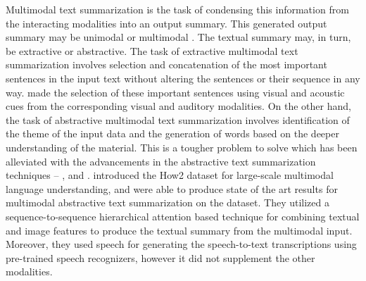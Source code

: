 \documentclass[11pt,a4paper]{article}
\begin{document}
Multimodal text summarization is the task of condensing this information from the interacting modalities into an output summary. This generated output summary may be unimodal or multimodal \cite{zhu2018msmo}. The textual summary may, in turn, be extractive or abstractive. The task of extractive multimodal text summarization involves selection and concatenation of the most important sentences in the input text without altering the sentences or their sequence in any way. \citet{li2017multi} made the selection of these important sentences using visual and acoustic cues from the corresponding visual and auditory modalities. On the other hand, the task of abstractive multimodal text summarization involves identification of the theme of the input data and the generation of words based on the deeper understanding of the material. This is a tougher problem to solve which has been alleviated with the advancements in the abstractive text summarization techniques -- \citet{rush2015neural}, \citet{see2017get} and \citet{liu2019text}. \citet{sanabria2018how2} introduced the How2 dataset for large-scale multimodal language understanding, and \citet{palaskar2019multimodal} were able to produce state of the art results for multimodal abstractive text summarization on the dataset. They utilized a sequence-to-sequence hierarchical attention based technique \cite{libovicky2017attention} for combining textual and image features to produce the textual summary from the multimodal input. Moreover, they used speech for generating the speech-to-text transcriptions using pre-trained speech recognizers, however it did not supplement the other modalities.
\end{document}
